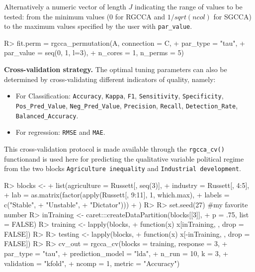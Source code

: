 \documentclass[
]{jss}
\begin{document}
\normalsize

Alternatively a numeric vector of length \(J\) indicating the range of
values to be tested: from the minimum values (0 for RGCCA and
\(1/sqrt(ncol)\) for SGCCA) to the maximum values specified by the user
with \texttt{par\_value}.

\footnotesize

\begin{CodeChunk}
\begin{CodeInput}
R> fit.perm = rgcca_permutation(A, connection = C,
+                              par_type = "tau",
+                              par_value = seq(0, 1, l=3),
+                              n_cores = 1, n_perms = 5)
\end{CodeInput}
\end{CodeChunk}

\normalsize

\textbf{Cross-validation strategy.} The optimal tuning parameters can
also be determined by cross-validating different indicators of quality,
namely:

\begin{itemize}
\item
  For Classification: \texttt{Accuracy}, \texttt{Kappa}, \texttt{F1},
  \texttt{Sensitivity}, \texttt{Specificity}, \texttt{Pos\_Pred\_Value},
  \texttt{Neg\_Pred\_Value}, \texttt{Precision}, \texttt{Recall},
  \texttt{Detection\_Rate}, \texttt{Balanced\_Accuracy}.
\item
  For regression: \texttt{RMSE} and \texttt{MAE}.
\end{itemize}

This cross-validation protocol is made available through the
\texttt{rgcca\_cv()} functionand is used here for predicting the
qualitative variable political regime from the two blocks
\texttt{Agriculture\ inequality} and \texttt{Industrial\ development}.

\footnotesize

\begin{CodeChunk}
\begin{CodeInput}
R> blocks <- 
+   list(agriculture = Russett[, seq(3)],
+        industry = Russett[, 4:5],
+        lab = as.matrix(factor(apply(Russett[, 9:11], 1, which.max),
+                        labels = c("Stable", 
+                                   "Unstable",
+                                   "Dictator")))
+                )
R> 
R> set.seed(27) #my favorite number
R> inTraining <- caret:::createDataPartition(blocks[[3]], 
+                                   p = .75, list = FALSE)
R> training <- lapply(blocks, 
+                    function(x) x[inTraining, , drop = FALSE])
R> 
R> testing  <- lapply(blocks, 
+                    function(x) x[-inTraining, , drop = FALSE])
R> 
R> cv_out = rgcca_cv(blocks = training, response = 3, 
+                   par_type = "tau", 
+                   prediction_model = "lda", 
+                   n_run = 10, k = 3,
+                   validation = "kfold", 
+                   ncomp = 1, metric = "Accuracy")
\end{CodeInput}
\end{CodeChunk}
\end{document}
